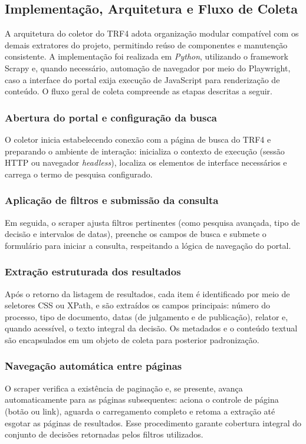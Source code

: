 \subsection{Implementação, Arquitetura e Fluxo de Coleta}
A arquitetura do coletor do TRF4 adota organização modular compatível com os demais extratores do projeto, permitindo reúso de componentes e manutenção consistente. A implementação foi realizada em \textit{Python}, utilizando o framework Scrapy e, quando necessário, automação de navegador por meio do Playwright, caso a interface do portal exija execução de JavaScript para renderização de conteúdo. O fluxo geral de coleta compreende as etapas descritas a seguir.

\subsubsection{Abertura do portal e configuração da busca}
O coletor inicia estabelecendo conexão com a página de busca do TRF4 e preparando o ambiente de interação: inicializa o contexto de execução (sessão HTTP ou navegador \textit{headless}), localiza os elementos de interface necessários e carrega o termo de pesquisa configurado.

\subsubsection{Aplicação de filtros e submissão da consulta}
Em seguida, o scraper ajusta filtros pertinentes (como pesquisa avançada, tipo de decisão e intervalos de datas), preenche os campos de busca e submete o formulário para iniciar a consulta, respeitando a lógica de navegação do portal.

\subsubsection{Extração estruturada dos resultados}
Após o retorno da listagem de resultados, cada item é identificado por meio de seletores CSS ou XPath, e são extraídos os campos principais: número do processo, tipo de documento, datas (de julgamento e de publicação), relator e, quando acessível, o texto integral da decisão. Os metadados e o conteúdo textual são encapsulados em um objeto de coleta para posterior padronização.

\subsubsection{Navegação automática entre páginas}
O scraper verifica a existência de paginação e, se presente, avança automaticamente para as páginas subsequentes: aciona o controle de página (botão ou link), aguarda o carregamento completo e retoma a extração até esgotar as páginas de resultados. Esse procedimento garante cobertura integral do conjunto de decisões retornadas pelos filtros utilizados.

